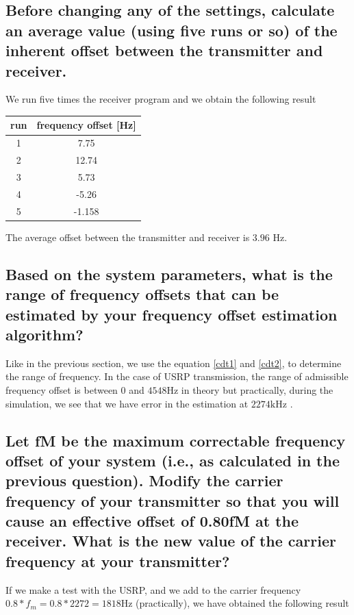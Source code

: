 \documentclass[frenchb, oneside, headings=normal]{scrartcl}
\begin{document}
\subsection{Before changing any of the settings, calculate an average value (using five runs or so) of the inherent offset between the transmitter and receiver.}

We run five times the receiver program and we obtain the following result
 
\begin{center}
	\begin{tabular}{c|c}
		run & frequency offset [\si{\hertz}]\\
		\hline
		1 & 7.75\\
		2 & 12.74\\
		3 & 5.73\\
		4 & -5.26\\
		5 & -1.158\\
	\end{tabular}
\end{center}

The average offset between the transmitter and receiver is $3.96$ \si{\hertz}. 


\subsection{Based on the system parameters, what is the range of frequency offsets that can be estimated by your frequency offset estimation algorithm?}

Like in the previous section, we use the equation \ref{cdt1} and \ref{cdt2}, to determine the range of frequency. In the case of USRP transmission, the range of admissible frequency offset is between $0$ and $4548 \si{\hertz}$ in theory but practically, during the simulation, we see that we have error in the estimation at $2274 \si{\kilo\hertz}$ .

\subsection{Let fM be the maximum correctable frequency offset of your system (i.e., as calculated in the previous question). Modify the carrier frequency of your transmitter so that you will cause an effective offset of 0.80fM at the receiver. What is the new value of the carrier frequency at your transmitter?}

If we make a test with the USRP, and we add to the carrier frequency $0.8*f_m=0.8*2272=1818 \si{\hertz}$ (practically), we have obtained the following result
\end{document}
